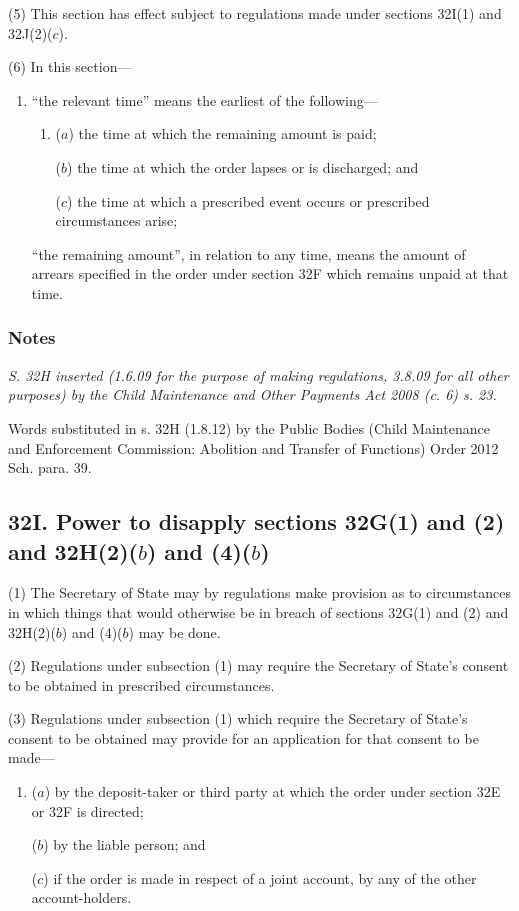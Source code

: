 \documentclass[a4paper]{article}
\newcommand\amendment[1]{\subsubsection*{Notes}{\itshape\frenchspacing\footnotesize #1 \par}}
\begin{document}
(5) This section has effect subject to regulations made under sections 32I(1) and
32J(2)($c$).

(6) In this section---
\begin{enumerate}\item[]
“the relevant time” means the earliest of the following---
\begin{enumerate}\item[]
($a$) the time at which the remaining amount is paid;

($b$) the time at which the order lapses or is discharged; and

($c$) the time at which a prescribed event occurs or prescribed circumstances
arise;
\end{enumerate}

“the remaining amount”, in relation to any time, means the amount of arrears
specified in the order under section 32F which remains unpaid at that time.
\end{enumerate}

\amendment{
S. 32H inserted (1.6.09 for the purpose of making regulations, 3.8.09 for all other purposes) by the Child Maintenance and Other Payments Act 2008 (c. 6)
s. 23.

Words substituted in s. 32H (1.8.12) by the Public Bodies (Child Maintenance and Enforcement Commission: Abolition and Transfer of Functions) Order 2012 Sch. para. 39.
}

\subsection{32I. Power to disapply sections 32G(1) and (2) and 32H(2)($b$) and (4)($b$)}

(1) The Secretary of State may by regulations make provision as to
circumstances in which things that would otherwise be in breach of sections 32G(1) and (2) and 32H(2)($b$) and (4)($b$) may be done.

(2) Regulations under subsection (1) may require the Secretary of State’s consent
to be obtained in prescribed circumstances.

(3) Regulations under subsection (1) which require the Secretary of State’s consent
to be obtained may provide for an application for that consent to be made---
\begin{enumerate}\item[]
($a$) by the deposit-taker or third party at which the order under section 32E or
32F is directed;

($b$) by the liable person; and

($c$) if the order is made in respect of a joint account, by any of the other account-holders.
\end{enumerate}
\end{document}
